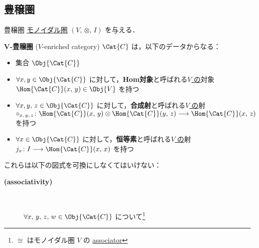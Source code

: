 \documentclass[TQFT_main]{subfiles}
\begin{document}
\subsection{豊穣圏}

\begin{mydef}[label=def:enriched,breakable]{豊穣圏}
    \hyperref[redef:monoidal-category]{モノイダル圏} $(V,\, \otimes,\, I)$ を与える．

    $\bm{V}$\textbf{-豊穣圏} ($V$-enriched category) $\Cat{C}$ は，以下のデータからなる：
    \begin{itemize}
        \item 集合 $\Obj{\Cat{C}}$
        \item $\forall x, y \in \Obj{\Cat{C}}$ に対して，\textbf{Hom対象}と呼ばれる\underline{$V$ の}対象 $\Hom{\Cat{C}}(x,\, y) \in \Obj{V}$ を持つ
        \item $\forall x, y,\, z \in \Obj{\Cat{C}}$ に対して，\textbf{合成射}と呼ばれる\underline{$V$ の}射 $\circ_{x,\, y,\, z} \colon \Hom{\Cat{C}}(x,\, y) \otimes \Hom{\Cat{C}}(y,\, z) \lto \Hom{\Cat{C}} (x,\, z)$ を持つ
        \item $\forall x \in \Obj{\Cat{C}}$ に対して，\textbf{恒等素}と呼ばれる\underline{$V$ の}射 $j_x \colon I \lto \Hom{\Cat{C}} (x,\, x)$ を持つ
    \end{itemize}
    これらは以下の図式を可換にしなくてはいけない：
    \begin{description}
        \item[\textbf{(associativity)}]　
        
        $\forall x,\, y,\, z,\, w \in \Obj{\Cat{C}}$ について\footnote{$\cong$ はモノイダル圏 $V$ の \hyperref[def:monoidal-category]{associator}}
        \begin{flushleft}
        \end{flushleft}
        

\end{description}
\end{mydef}
\end{document}

